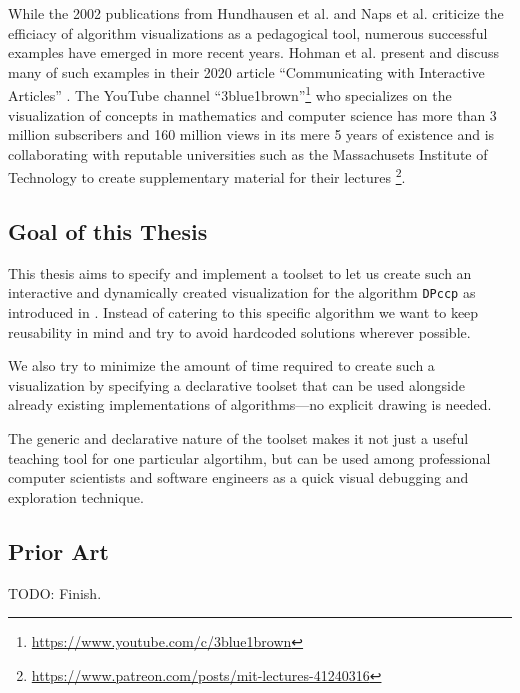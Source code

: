 
While the 2002 publications from Hundhausen et al. \cite{hundhausen2002meta} and Naps et al. \cite{naps2002exploring} criticize the efficiacy of algorithm visualizations as a pedagogical tool, numerous successful examples have emerged in more recent years.
Hohman et al. present and discuss many of such examples in their 2020 article ``Communicating with Interactive Articles'' \cite{hohman2020communicating}.
The YouTube channel ``3blue1brown''\footnote{\url{https://www.youtube.com/c/3blue1brown}} who specializes on the visualization of concepts in mathematics and computer science has more than 3 million subscribers and 160 million views in its mere 5 years of existence and is collaborating with reputable universities such as the Massachusets Institute of Technology to create supplementary material for their lectures \footnote{\url{https://www.patreon.com/posts/mit-lectures-41240316}}.

\subsection{Goal of this Thesis}
This thesis aims to specify and implement a toolset to let us create such an interactive and dynamically created visualization for the algorithm \texttt{DPccp} as introduced in \cite{moerkotte2006analysis}. Instead of catering to  this specific algorithm we want to keep reusability in mind and try to avoid hardcoded solutions wherever possible.

We also try to minimize the amount of time required to create such a visualization by specifying a declarative toolset that can be used alongside already existing implementations of algorithms—no explicit drawing is needed.

The generic and declarative nature of the toolset makes it not just a useful teaching tool for one particular algortihm, but can be used among professional computer scientists and software engineers as a quick visual debugging and exploration technique.



\subsection{Prior Art}

TODO: Finish.